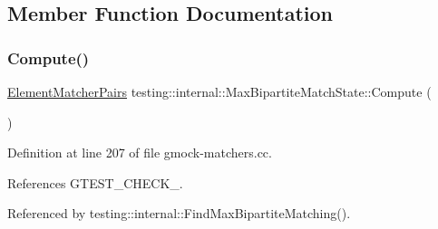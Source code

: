 \subsection{Member Function Documentation}
\mbox{\label{classtesting_1_1internal_1_1MaxBipartiteMatchState_af6efab664ee390925b24d023f1368192}} 
\subsubsection{\texorpdfstring{Compute()}{Compute()}}
{\footnotesize\ttfamily \hyperlink{namespacetesting_1_1internal_a0038618710c01a71150887dc7cfb0a29}{Element\+Matcher\+Pairs} testing\+::internal\+::\+Max\+Bipartite\+Match\+State\+::\+Compute (\begin{DoxyParamCaption}{ }\end{DoxyParamCaption})\hspace{0.3cm}{\ttfamily [inline]}}



Definition at line 207 of file gmock-\/matchers.\+cc.



References G\+T\+E\+S\+T\+\_\+\+C\+H\+E\+C\+K\+\_\+.



Referenced by testing\+::internal\+::\+Find\+Max\+Bipartite\+Matching().


